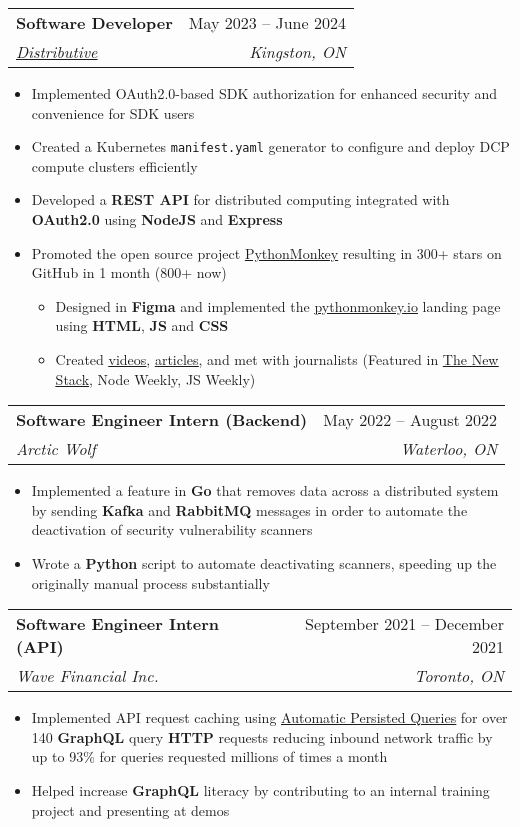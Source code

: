 \documentclass[letterpaper,11pt]{article}
\makeatletter
\newcommand{\resumeItem}[1]{
  \item\small{
    {#1 \vspace{-2pt}}
  }
}
\newcommand{\resumeSubheading}[4]{
  \vspace{1pt}\item
    \begin{tabular*}{0.97\textwidth}[t]{l@{\extracolsep{\fill}}r}
      \textbf{#1} & #2 \\
      \textit{\small#3} & \textit{\small #4} \\
    \end{tabular*}\vspace{-7pt}
}
\newcommand{\resumeItemListStart}{\begin{itemize}}
\newcommand{\resumeItemListEnd}{\end{itemize}\vspace{-5pt}}
\makeatother
\begin{document}
    \resumeSubheading
      {Software Developer}{May 2023 -- June 2024}
      {\href{https://distributive.network/}{\underline{Distributive}}}{Kingston, ON}
      \resumeItemListStart 
        \resumeItem{Implemented OAuth2.0-based SDK authorization for enhanced security and convenience for SDK users}
        \resumeItem{Created a Kubernetes \texttt{manifest.yaml} generator to configure and deploy DCP compute clusters efficiently}
        \resumeItem{Developed a \textbf{REST API} for distributed computing integrated with \textbf{OAuth2.0} using \textbf{NodeJS} and \textbf{Express}}
        \resumeItem{Promoted the open source project \href{https://github.com/Distributive-Network/PythonMonkey}{\underline{PythonMonkey}} resulting in 300+ stars on GitHub in 1 month (800+ now)}
      	\resumeItemListStart 
        	\resumeItem{Designed in \textbf{Figma} and implemented the \href{https://pythonmonkey.io/}{\underline{pythonmonkey.io}} landing page using \textbf{HTML}, \textbf{JS} and \textbf{CSS}}
        	\resumeItem{Created \href{https://youtu.be/UmlSryXsh30}{\underline{videos}}, \href{https://distributive.network/jobs/python-monkey}{\underline{articles}}, and met with journalists (Featured in \href{https://thenewstack.io/python-meets-javascript-wasm-with-the-magic-of-pythonmonkey/}{\underline{The New Stack}}, Node Weekly, JS Weekly)}
      	\resumeItemListEnd
      \resumeItemListEnd

    \resumeSubheading
      {Software Engineer Intern (Backend)}{May 2022 -- August 2022}
      {Arctic Wolf}{Waterloo, ON}
      \resumeItemListStart 
        \resumeItem{Implemented a feature in \textbf{Go} that removes data across a distributed system by sending \textbf{Kafka} and \textbf{RabbitMQ} messages in order to automate the deactivation of security vulnerability scanners}
        \resumeItem{Wrote a \textbf{Python} script to automate deactivating scanners, speeding up the originally manual process substantially}
      \resumeItemListEnd


    \resumeSubheading
      {Software Engineer Intern (API)}{September 2021 -- December 2021}
      {Wave Financial Inc.}{Toronto, ON}
      \resumeItemListStart 
        \resumeItem{Implemented API request caching using \href{https://www.apollographql.com/docs/apollo-server/performance/apq/}{\underline{Automatic Persisted Queries}} for over 140 \textbf{GraphQL} query \textbf{HTTP} requests reducing inbound network traffic by up to 93\% for queries requested millions of times a month}
        \resumeItem{Helped increase \textbf{GraphQL} literacy by contributing to an internal training project and presenting at demos}
      \resumeItemListEnd
    
\end{document}

